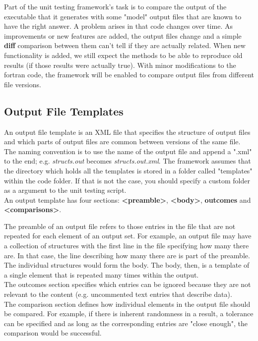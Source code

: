 \documentclass[paper=a4, fontsize=11pt]{scrartcl} %
\numberwithin{equation}{section} %
\numberwithin{figure}{section} %
\numberwithin{table}{section} %
\begin{document}
Part of the unit testing framework's task is to compare the output of the executable that it generates
with some "model" output files that are known to have the right answer. A problem arises in that code
changes over time. As improvements or new features are added, the output files change and a simple
\textbf{diff} comparison between them can't tell if they are actually related. When new functionality
is added, we still expect the methods to be able to reproduce old results (if those results were
actually true). With minor modifications to the fortran code, the framework will be enabled to compare
output files from different file versions.

\subsection{Output File Templates}

An output file template is an XML file that specifies the structure of output files and which
parts of output files are common between versions of the same file. The naming convention is
to use the name of the output file and append a ".xml" to the end; e.g. \textit{structs.out} becomes
\textit{structs.out.xml}. The framework assumes that the directory which holds all the templates
is stored in a folder called "templates" within the code folder. If that is not the case, you
should specify a custom folder as a argument to the unit testing script.\\

An output template has four sections: \textbf{<preamble>}, \textbf{<body>}, \textbf{outcomes}
and \textbf{<comparisons>}.

The preamble of an output file refers to those entries in the file that are not repeated for each
element of an output set. For example, an output file may have a collection of structures with the
first line in the file specifying how many there are. In that case, the line describing how many
there are is part of the preamble. The individual structures would form the body. The body, then,
is a template of a single element that is repeated many times within the output.\\

The outcomes section specifies which entries can be ignored because they are not relevant to 
the content (e.g. uncommented text entries that describe data).\\

The comparison section defines how individual elements in the output file should be compared. For
example, if there is inherent randomness in a result, a tolerance can be specified and as long
as the corresponding entries are "close enough", the comparison would be successful. \\
\end{document}

